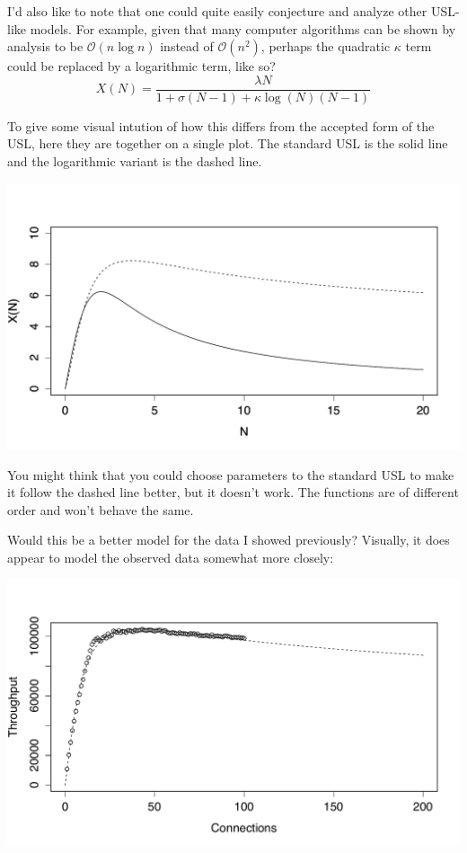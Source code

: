 \documentclass{vivid_layout}
\begin{document}
I'd also like to note that one could quite easily conjecture and analyze other
USL-like models. For example, given that many computer algorithms can be shown
by analysis to be $\mathcal{O}(n\log{}n)$ instead of $\mathcal{O}(n^2)$, perhaps
the quadratic $\kappa$ term could be replaced by a logarithmic term, like so?
\[
X(N) = \frac{\lambda N}{1 + \sigma(N-1) + \kappa \log(N)(N-1)}
\]

To give some visual intution of how this differs from the accepted form of the
USL, here they are together on a single plot. The standard USL is the solid line
and the logarithmic variant is the dashed line.
\begin{center}
\includegraphics[width=.85\linewidth]{scalability/logscale}
\end{center}

You might think that you could choose parameters to the standard USL to make it
follow the dashed line better, but it doesn't work. The functions are of
different order and won't behave the same.

Would this be a better model for the data I showed previously? Visually, it does
appear to model the observed data somewhat more closely:
\begin{center}
\includegraphics[width=.85\linewidth]{scalability/logscale-2}
\end{center}
\end{document}

